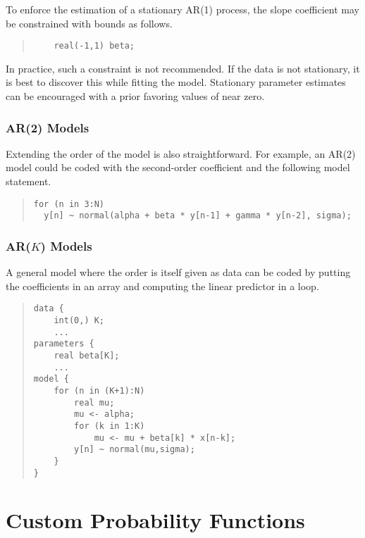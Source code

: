 To enforce the estimation of a stationary AR(1) process, the slope
coefficient  may be constrained with bounds as follows.
%
\begin{quote}
\begin{Verbatim}
    real(-1,1) beta;
\end{Verbatim}
\end{quote}
%
In practice, such a constraint is not recommended.  If the data is not
stationary, it is best to discover this while fitting the model.
Stationary parameter estimates can be encouraged with a prior favoring
values of  near zero.


\subsection{AR(2) Models}

Extending the order of the model is also straightforward.  For
example, an AR(2) model could be coded with the second-order
coefficient  and the following model statement.
%
\begin{quote}
\begin{Verbatim}
for (n in 3:N)
  y[n] ~ normal(alpha + beta * y[n-1] + gamma * y[n-2], sigma);
\end{Verbatim}
\end{quote}


\subsection{AR($K$) Models}

A general model where the order is itself given as data can be coded
by putting the coefficients in an array and computing the linear
predictor in a loop.
%
\begin{quote}
\begin{Verbatim}
data {
    int(0,) K;
    ...
parameters {
    real beta[K];
    ...
model {
    for (n in (K+1):N)
        real mu;
        mu <- alpha;
        for (k in 1:K)
            mu <- mu + beta[k] * x[n-k];
        y[n] ~ normal(mu,sigma);
    }
}
\end{Verbatim}
\end{quote}





\chapter{Custom Probability  Functions}%
\label{custom-probability-functions.chapter}

